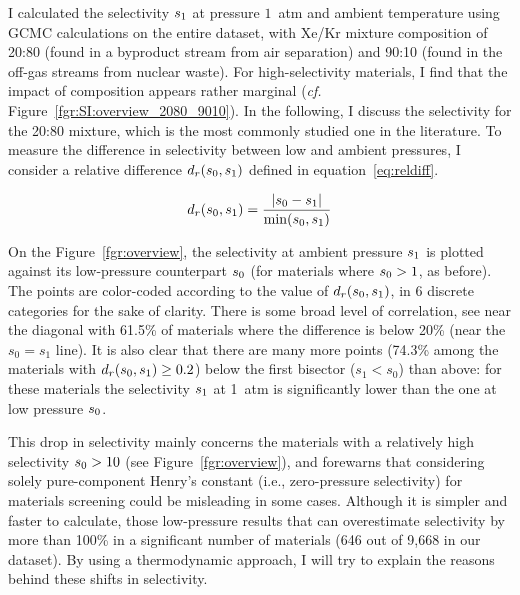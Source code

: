 \documentclass[main.tex]{subfiles}
\begin{document}
I calculated the selectivity $s_{\text{1}}$ at pressure $1$~atm and ambient temperature using GCMC calculations on the entire dataset, with Xe/Kr mixture composition of 20:80 (found in a byproduct stream from air separation\autocite{kerry2007industrial}) and 90:10 (found in the off-gas streams from nuclear waste\autocite{auerbach2003handbook}). For high-selectivity materials, I find that the impact of composition appears rather marginal (\emph{cf.} Figure~\ref{fgr:SI:overview_2080_9010}). In the following, I discuss the selectivity for the 20:80 mixture, which is the most commonly studied one in the literature. To measure the difference in selectivity between low and ambient pressures, I consider a relative difference $d_r(s_{\text{0}},s_{\text{1}})$ defined in equation~\ref{eq:reldiff}.

\begin{equation}\label{eq:reldiff}
    d_r(s_{\text{0}},s_{\text{1}}) = \dfrac{\lvert s_{\text{0}} - s_{\text{1}} \rvert}{\min(s_{\text{0}},s_{\text{1}})}
\end{equation}

On the Figure~\ref{fgr:overview}, the selectivity at ambient pressure $s_{\text{1}}$ is plotted against its low-pressure counterpart $s_{\text{0}}$ (for materials where $s_{\text{0}} > 1$, as before). The points are color-coded according to the value of $d_r(s_{\text{0}},s_{\text{1}})$, in 6 discrete categories for the sake of clarity. There is some broad level of correlation, see near the diagonal with {61.5\%} of materials where the difference is below {20\%} (near the $s_0 = s_1$ line). It is also clear that there are many more points ({74.3\%} among the materials with $d_r(s_{\text{0}},s_{\text{1}})\ge 0.2$) below the first bisector ($s_1 < s_0$) than above: for these materials the selectivity $s_{\text{1}}$ at 1~atm is significantly lower than the one at low pressure $s_{\text{0}}$.

This drop in selectivity mainly concerns the materials with a relatively high selectivity $s_{\text{0}} > 10$ (see Figure~\ref{fgr:overview}), and forewarns that considering solely pure-component Henry's constant (i.e., zero-pressure selectivity) for materials screening could be misleading in some cases. Although it is simpler and faster to calculate, those low-pressure results that can overestimate selectivity by more than {100\%} in a significant number of materials (646 out of 9,668 in our dataset). 
By using a thermodynamic approach, I will try to explain the reasons behind these shifts in selectivity.
\end{document}
